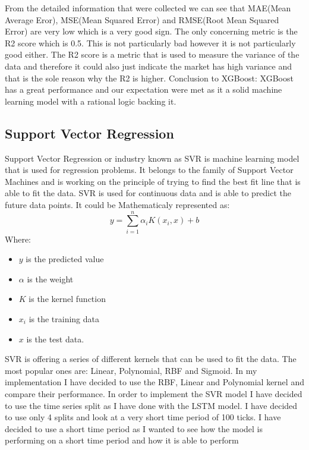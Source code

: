 \documentclass{imc-inf}
\begin{document}
			From the detailed information that were collected we can see that MAE(Mean Average Eror), MSE(Mean Squared Error) and RMSE(Root Mean Squared Error) are very low which is a very good sign. The only concerning metric is the R2 score which is 0.5.
			This is not particularly bad however it is not particularly good either. The R2 score is a metric that is used to measure the variance of the data and therefore it could also just indicate the market has high variance and that is the 
			sole reason why the R2 is higher. Conclusion to XGBoost: XGBoost has a great performance and our expectation were met as it a solid machine learning model with a rational logic backing it.
		\subsection{Support Vector Regression}
			Support Vector Regression or industry known as SVR \cite{svr_implement} is machine learning model that is used for regression problems. It belongs to the family of Support Vector Machines and is working on the 
			principle of trying to find the best fit line that is able to fit the data. SVR is used for continuous data and is able to predict the future data points. It could be Mathematicaly represented as:
			\begin{equation}
				y = \sum_{i=1}^{n} \alpha_i K(x_i,x) + b
			\end{equation}
			Where:
			\begin{itemize}
				\item $y$ is the predicted value
				\item  $\alpha$ is the weight 
				\item  $K$ is the kernel function
				\item  $x_i$ is the training data
				\item  $x$ is the test data.

			\end{itemize}
			SVR is offering a series of different kernels that can be used to fit the data. The most popular ones are: Linear, Polynomial, RBF and Sigmoid.
			In my implementation I have decided to use the RBF, Linear and Polynomial kernel and compare their performance. In order to implement the SVR model I have decided to use the time series split as I have done with the LSTM model.
			I have decided to use only 4 splits and look at a very short time period of 100 ticks. I have decided to use a short time period as I wanted to see how the model is performing on a short time period and how it is able to perform 
\end{document}
